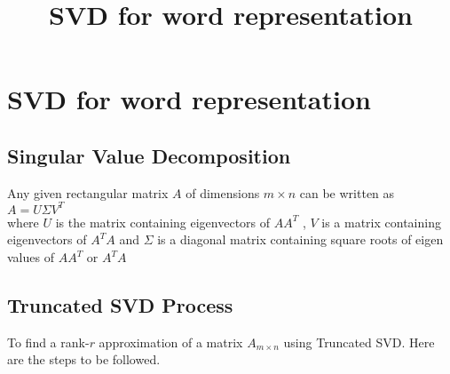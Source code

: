 \documentclass{book}
\title{SVD for word representation}
\author{}
\date{}
\begin{document}
\chapter{SVD for word representation}
\section{Singular Value Decomposition}
Any given rectangular matrix $A$ of dimensions $m\times n$ can be written as $A=U\Sigma V^T$\\
where $U$ is the matrix containing eigenvectors of $AA^T$ , $V$ is a matrix containing eigenvectors of $A^TA$ and $\Sigma$ is a diagonal matrix containing square roots of eigen values of $AA^T$ or $A^TA$

\section{Truncated SVD Process}
To find a rank-$r$ approximation of a matrix $A_{m\times n}$ using Truncated SVD. Here are the steps to be followed.
\end{document}
